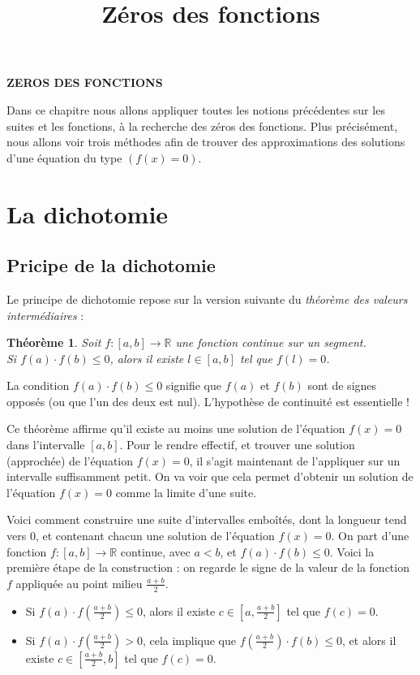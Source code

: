 \documentclass[a4paper,12pt]{article}
\title{Zéros des fonctions}
\newtheorem{theorem}{Théorème}
\begin{document}
\begin{center}
        \Huge \textbf{ZEROS DES FONCTIONS}
\end{center}
\vspace{1cm}

Dans ce chapitre nous allons appliquer toutes les notions précédentes sur les suites et les fonctions, à la recherche des zéros des fonctions. Plus précisément, nous allons voir trois méthodes afin de trouver des approximations des solutions d'une équation du type $ ( f (x) = 0) $.

\section{La dichotomie}
\subsection{Pricipe de la dichotomie}
    Le principe de dichotomie repose sur la version suivante du \textit{théorème des valeurs intermédiaires} :
    
    \begin{theorem}
    Soit $ f:[a,b] \longrightarrow \mathbb{R}$ une fonction continue sur un segment.\\
    Si $f(a) \cdot f(b) \leq 0$, alors il existe $l \in [a, b] $ tel que  $f(l) = 0$.
    \end{theorem}
    
    La condition $f(a) \cdot f(b) \leq 0$ signifie que $f(a)$ et $f(b)$ sont de signes opposés (ou que l'un des deux est nul). L'hypothèse de continuité est essentielle !

    \vspace{0.5cm}

    Ce théorème affirme qu'il existe au moins une solution de l'équation $f (x) = 0$ dans l'intervalle $[a, b]$.
    Pour le rendre effectif, et trouver une solution (approchée) de l'équation $ f(x) = 0$, il s'agit maintenant de l'appliquer sur un intervalle suffisamment petit. On va voir que cela permet d'obtenir un solution de
    l'équation $f (x) = 0$ comme la limite d'une suite.

    \vspace{0.5cm}
    
    Voici comment construire une suite d'intervalles emboîtés, dont la longueur tend vers $0$, et contenant chacun une solution de l'équation $f (x) = 0$.
    On part d'une fonction $f : [a, b] \rightarrow \mathbb{R}$ continue, avec $a < b$, et $f (a)\cdot f (b) \leq 0$.
    Voici la première étape de la construction : on regarde le signe de la valeur de la fonction $f$ appliquée au
    point milieu $\frac{a+b}{2}$.
    \begin{itemize}
        \item Si $f(a) \cdot f(\frac{a+b}{2}) \leq 0$, alors il existe $c \in [a, \frac{a+b}{2}]$ tel que $f(c) = 0$. 
        \item Si $f(a) \cdot f(\frac{a+b}{2}) > 0$, cela implique que $f ( \frac{a+b}{2}) \cdot f(b) \leq 0$, et alors il existe $c \in [\frac{a+b}{2}, b]$ tel que $f (c) = 0$.
    \end{itemize} 
\end{document}
